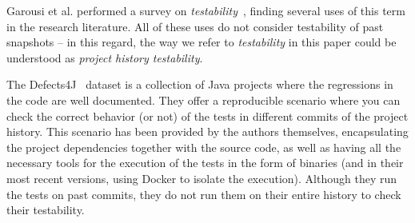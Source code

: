 Garousi et al. performed a survey on \textit{testability}~\cite{garousi2019survey}, finding several uses of this term in the research literature. All of these uses do not consider testability of past snapshots -- in this regard, the way we refer to \textit{testability} in this paper could be understood as \textit{project history testability}.


The Defects4J~\cite{just2014defects4j} dataset is a collection of Java projects where the regressions in the code are well documented. They offer a reproducible scenario where you can check the correct behavior (or not) of the tests in different commits of the project history. This scenario has been provided by the authors themselves, encapsulating the project dependencies together with the source code, as well as having all the necessary tools for the execution of the tests in the form of binaries (and in their most recent versions, using Docker to isolate the execution). Although they run the tests on past commits, they do not run them on their entire history to check their testability.

